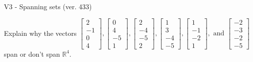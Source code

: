 \begin{exercise}
  \begin{exerciseTitle}V3 - Spanning sets (ver. 433)\end{exerciseTitle}
  \begin{exerciseStatement}
    Explain why the vectors \(\left[\begin{array}{r}
2 \\
-1 \\
0 \\
4
\end{array}\right] , \left[\begin{array}{r}
0 \\
4 \\
-5 \\
1
\end{array}\right] , \left[\begin{array}{r}
2 \\
-4 \\
-5 \\
2
\end{array}\right] , \left[\begin{array}{r}
1 \\
3 \\
-4 \\
-5
\end{array}\right] , \left[\begin{array}{r}
1 \\
-1 \\
-2 \\
1
\end{array}\right] , \text{ and } \left[\begin{array}{r}
-2 \\
-3 \\
-2 \\
-5
\end{array}\right]\) span or don't span \(\mathbb{R}^4\). 
	



\end{exerciseStatement}
\end{exercise}
